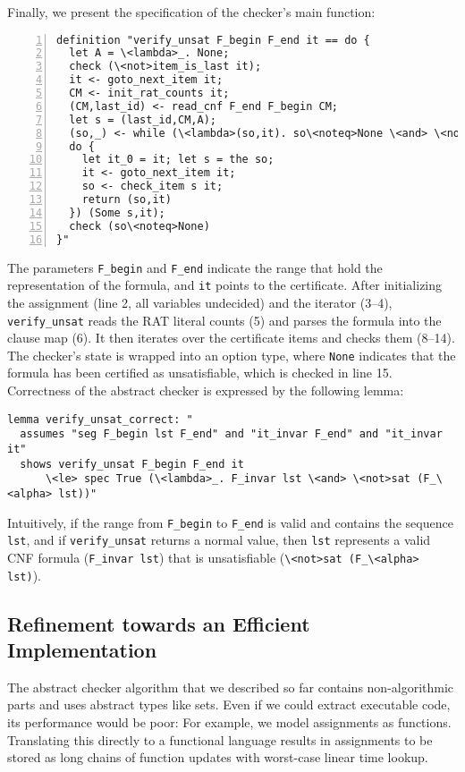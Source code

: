 \documentclass{llncs}
\newcommand{\isai}{\lstinline[language=isabelle,basicstyle=\normalsize\ttfamily\slshape]}
\begin{document}
Finally, we present the specification of the checker's main function:
\begin{lstlisting}[numbers=left, xleftmargin=2em]
definition "verify_unsat F_begin F_end it == do {
  let A = \<lambda>_. None;
  check (\<not>item_is_last it);
  it <- goto_next_item it;
  CM <- init_rat_counts it;
  (CM,last_id) <- read_cnf F_end F_begin CM;
  let s = (last_id,CM,A);
  (so,_) <- while (\<lambda>(so,it). so\<noteq>None \<and> \<not>item_is_last it) (\<lambda>(so,it). 
  do {
    let it_0 = it; let s = the so;
    it <- goto_next_item it;
    so <- check_item s it;
    return (so,it)
  }) (Some s,it);
  check (so\<noteq>None)
}"
\end{lstlisting}
The parameters \isai{F_begin} and \isai{F_end} indicate the range that hold the representation of the formula, and \isai{it} points to the 
certificate. %
After initializing the assignment (line 2, all variables undecided) and the iterator (3--4), \isai{verify_unsat} reads the RAT literal counts (5)
and parses the formula into the clause map (6). It then iterates over the certificate items and checks them (8--14). 
The checker's state is wrapped into an option type, where \isai{None} indicates that the formula has been certified as unsatisfiable, which is checked in line 15.
%
Correctness of the abstract checker is expressed by the following lemma:
\begin{lstlisting}
lemma verify_unsat_correct: "
  assumes "seg F_begin lst F_end" and "it_invar F_end" and "it_invar it" 
  shows verify_unsat F_begin F_end it 
      \<le> spec True (\<lambda>_. F_invar lst \<and> \<not>sat (F_\<alpha> lst))"
\end{lstlisting}
Intuitively, if the range from \isai{F_begin} to \isai{F_end} is valid and contains the sequence \isai{lst},
and if \isai{verify_unsat} returns a normal value, then \isai{lst} represents a valid CNF formula (\isai{F_invar lst}) 
that is unsatisfiable (\isai{\<not>sat (F_\<alpha> lst)}).

\subsection{Refinement towards an Efficient Implementation}    
The abstract checker algorithm that we described so far contains non-algorithmic parts and uses abstract types like sets.
Even if we could extract executable code, its performance would be poor: For example, we model assignments as functions. Translating 
this directly to a functional language results in assignments to be stored as long chains of function updates with worst-case linear time lookup.
\end{document}
